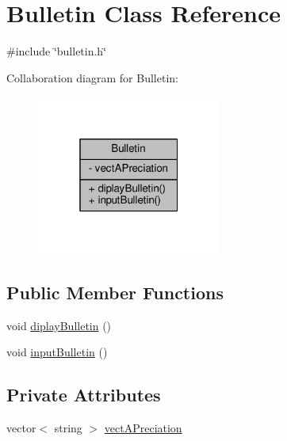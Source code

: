 \hypertarget{classBulletin}{\section{Bulletin Class Reference}
\label{classBulletin}
}


{\ttfamily \#include \char`\"{}bulletin.\+h\char`\"{}}



Collaboration diagram for Bulletin\+:
\nopagebreak
\begin{figure}[H]
\begin{center}
\leavevmode
\includegraphics[width=172pt]{classBulletin__coll__graph}
\end{center}
\end{figure}
\subsection*{Public Member Functions}
\begin{DoxyCompactItemize}
\item 
void \hyperlink{classBulletin_a85da8a1dcad54020dbedbb087c743fee}{diplay\+Bulletin} ()
\item 
void \hyperlink{classBulletin_a79eef3d62958cb9f24ac2310724d4915}{input\+Bulletin} ()
\end{DoxyCompactItemize}
\subsection*{Private Attributes}
\begin{DoxyCompactItemize}
\item 
vector$<$ string $>$ \hyperlink{classBulletin_adfe1cb1bd5cf7868f170818cf9086e49}{vect\+A\+Preciation}
\end{DoxyCompactItemize}


